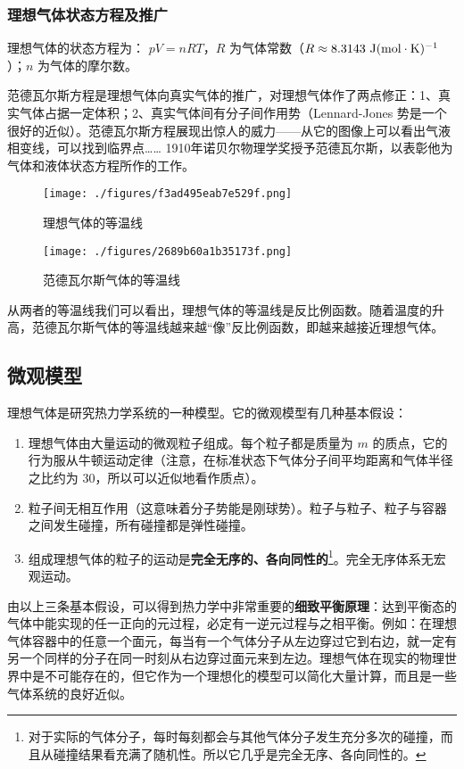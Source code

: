 \subsubsection{理想气体状态方程及推广}
理想气体的状态方程为： $pV=nRT$，$R$ 为气体常数（$R\approx 8.3143\ \rm{J}(\rm{mol\cdot K})^{-1}$）；$n$ 为气体的摩尔数。

范德瓦尔斯方程是理想气体向真实气体的推广，对理想气体作了两点修正：1、真实气体占据一定体积；2、真实气体间有分子间作用势（Lennard-Jones 势是一个很好的近似）。范德瓦尔斯方程展现出惊人的威力——从它的图像上可以看出气液相变线，可以找到临界点…… 1910年诺贝尔物理学奖授予范德瓦尔斯，以表彰他为气体和液体状态方程所作的工作。
\begin{figure}[ht]
\centering
\texttt{[image: ./figures/f3ad495eab7e529f.png]}
\caption{理想气体的等温线} \label{fig_Igas_1}
\end{figure}
\begin{figure}[ht]
\centering
\texttt{[image: ./figures/2689b60a1b35173f.png]}
\caption{范德瓦尔斯气体的等温线} \label{fig_Igas_2}
\end{figure}

从两者的等温线我们可以看出，理想气体的等温线是反比例函数。随着温度的升高，范德瓦尔斯气体的等温线越来越“像”反比例函数，即越来越接近理想气体。
\subsection{微观模型}

理想气体是研究热力学系统的一种模型。它的微观模型有几种基本假设：
\begin{enumerate}
\item 理想气体由大量运动的微观粒子组成。每个粒子都是质量为 $m$ 的质点，它的行为服从牛顿运动定律（注意，在标准状态下气体分子间平均距离和气体半径之比约为 $30$，所以可以近似地看作质点）。

\item 粒子间无相互作用（这意味着分子势能是刚球势）。粒子与粒子、粒子与容器之间发生碰撞，所有碰撞都是弹性碰撞。

\item 组成理想气体的粒子的运动是\textbf{完全无序的、各向同性的}\footnote{对于实际的气体分子，每时每刻都会与其他气体分子发生充分多次的碰撞，而且从碰撞结果看充满了随机性。所以它几乎是完全无序、各向同性的。}。完全无序体系无宏观运动。
\end{enumerate}

由以上三条基本假设，可以得到热力学中非常重要的\textbf{细致平衡原理}：达到平衡态的气体中能实现的任一正向的元过程，必定有一逆元过程与之相平衡。例如：在理想气体容器中的任意一个面元，每当有一个气体分子从左边穿过它到右边，就一定有另一个同样的分子在同一时刻从右边穿过面元来到左边。理想气体在现实的物理世界中是不可能存在的，但它作为一个理想化的模型可以简化大量计算，而且是一些气体系统的良好近似。

